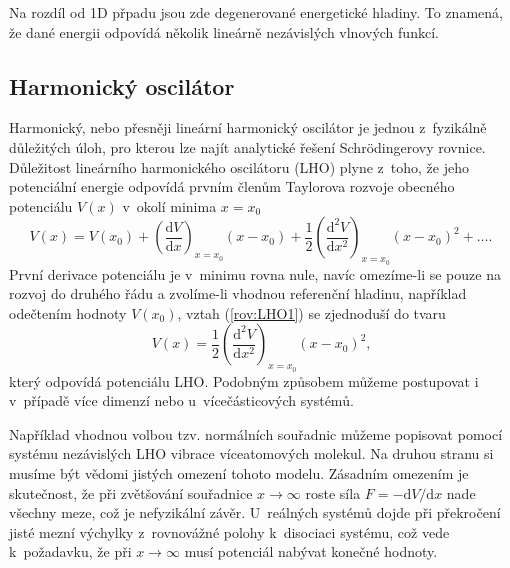 Na rozdíl od 1D přpadu jsou zde degenerované energetické hladiny. To znamená, že dané energii odpovídá několik lineárně nezávislých vlnových funkcí.

\subsection{Harmonický oscilátor}
\label{kap:HarmonickyOscilator}

Harmonický, nebo přesněji lineární harmonický oscilátor je jednou z~fyzikálně důležitých úloh, pro kterou lze najít analytické řešení Schrödingerovy rovnice. Důležitost lineárního harmonického oscilátoru (LHO) plyne z~toho, že jeho potenciální energie odpovídá prvním členům Taylorova rozvoje obecného potenciálu $V(x)$ v~okolí minima $x=x_0$
\begin{equation}
V(x) = V(x_0) + \left(\frac{\mathrm{d}V}{\mathrm{d}x} \right)_{x=x_0} (x-x_0) + \frac{1}{2} \left(\frac{\mathrm{d}^2V}{\mathrm{d}x^2} \right)_{x=x_0} (x-x_0)^2 + \dots \mbox{.}
\label{rov:LHO1}
\end{equation}
První derivace potenciálu je v~minimu rovna nule, navíc omezíme-li se pouze na rozvoj do druhého řádu a zvolíme-li vhodnou referenční hladinu, například odečtením hodnoty $V(x_0)$, vztah (\ref{rov:LHO1}) se zjednoduší do tvaru
\begin{equation}
V(x) = \frac{1}{2} \left(\frac{\mathrm{d}^2V}{\mathrm{d}x^2} \right)_{x=x_0} (x-x_0)^2 \mbox{,}
\label{rov:LHO2}
\end{equation}
který odpovídá potenciálu LHO. Podobným způsobem můžeme postupovat i v~případě více dimenzí nebo u~vícečásticových systémů.

Například vhodnou volbou tzv. normálních souřadnic můžeme popisovat pomocí systému nezávislých LHO vibrace víceatomových molekul. Na druhou stranu si musíme být vědomi jistých omezení tohoto modelu. Zásadním omezením je skutečnost, že při zvětšování souřadnice $x \rightarrow \infty$ roste síla $F = -\mathrm{d}V/ \mathrm{d}x$ nade všechny meze, což je nefyzikální závěr. U~reálných systémů dojde při překročení jisté mezní výchylky z~rovnovážné polohy k~disociaci systému, což vede k~požadavku, že při $x \rightarrow \infty$ musí potenciál nabývat konečné hodnoty.

